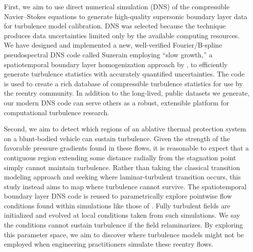 
First, we aim to use direct numerical simulation (DNS) of the compressible
Navier--Stokes equations to generate high-quality supersonic boundary layer data
for turbulence model calibration.  DNS was selected because the technique
produces data uncertainties limited only by the available computing resources.
We have designed and implemented a new, well-verified Fourier/B-spline
pseudospectral DNS code called Suzerain employing ``slow growth,'' a spatiotemporal boundary layer
homogenization approach by \citet{Topalian2011Slow, Topalian2014Temporal,
Topalian2014Spatiotemporal}, to efficiently generate turbulence statistics with
accurately quantified uncertainties.  The code is used to create a rich database
of compressible turbulence statistics for use by the reentry community.  In
addition to the long-lived, public datasets we generate, our modern DNS code can
serve others as a robust, extensible platform for computational turbulence
research.


Second, we aim to detect which regions of an ablative thermal protection system
on a blunt-bodied vehicle can sustain turbulence.  Given the strength of the
favorable pressure gradients found in these flows, it is reasonable to expect
that a contiguous region extending some distance radially from the stagnation
point simply cannot maintain turbulence.  Rather than taking the classical
transition modeling approach and seeking where laminar-turbulent transition
occurs, this study instead aims to map where turbulence cannot survive.  The
spatiotemporal boundary layer DNS code is reused to
parametrically explore
pointwise flow conditions found within simulations like those of
\citet{Bauman2011Loose}.  Fully turbulent fields are initialized and evolved at
local conditions taken from such simulations.  We say the conditions cannot
sustain turbulence if the field relaminarizes.  By exploring this parameter
space, we aim to discover where turbulence models might not be employed when
engineering practitioners simulate these reentry flows.

